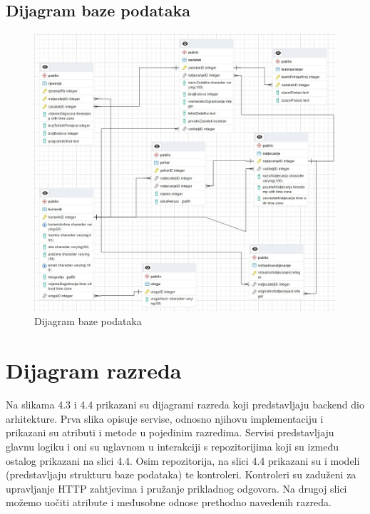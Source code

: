 		
\pagebreak
\subsection{Dijagram baze podataka}
\begin{figure}[H]
	\includegraphics[scale=0.9]{dijagrami/dijagram_baze_podataka.jpeg} 
	\centering
	\caption{Dijagram baze podataka}
	\label{fig:bazaPodataka} 
\end{figure}

\eject


\section{Dijagram razreda}

Na slikama 4.3 i 4.4 prikazani su dijagrami razreda koji predstavljaju backend dio arhitekture.
Prva slika opisuje servise, odnosno njihovu implementaciju i prikazani su atributi i metode u pojedinim razredima.
Servisi predstavljaju glavnu logiku i oni su uglavnom u interakciji s repozitorijima koji su između ostalog prikazani na slici 4.4.
Osim repozitorija, na slici 4.4 prikazani su i modeli (predstavljaju strukturu baze podataka) te kontroleri. 
Kontroleri su zaduženi za upravljanje HTTP zahtjevima i pružanje prikladnog odgovora. Na drugoj slici možemo uočiti atribute i međusobne odnose prethodno navedenih razreda. \\

